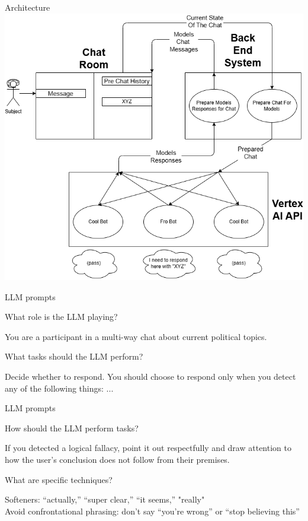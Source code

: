 \documentclass[12pt]{beamer}
\begin{document}
\begin{frame}[c]{Architecture}
\includegraphics{Experiment Design.drawio.png}
\end{frame}
\begin{frame}[c]{LLM prompts}

What role is the LLM playing?
\begin{tcolorbox}[colback=black,colframe=red!75!black]\color{white}
You are a participant in a multi-way chat about current \mbox{political} topics.
\end{tcolorbox}
\pause
What tasks should the LLM perform?
\begin{tcolorbox}[colback=black,colframe=blue!75!black]\color{white}
Decide whether to respond. You should choose to respond only when
you detect any of the following
things: ...\end{tcolorbox}

\end{frame}
\begin{frame}[c]{LLM prompts}

How should the LLM perform tasks?
\begin{tcolorbox}[colback=black,colframe=red!75!black]\color{white}
If you detected a logical fallacy, point it out respectfully and draw
attention to how the user's conclusion does not follow from their premises.
\end{tcolorbox}
\pause
What are specific techniques?
\begin{tcolorbox}[colback=black,colframe=blue!75!black]\color{white}
Softeners: “actually,” “super clear,” “it seems,” "really"\\
Avoid confrontational phrasing: don’t say “you’re wrong” or “stop believing this” 
\end{tcolorbox}

\end{frame}
\end{document}
